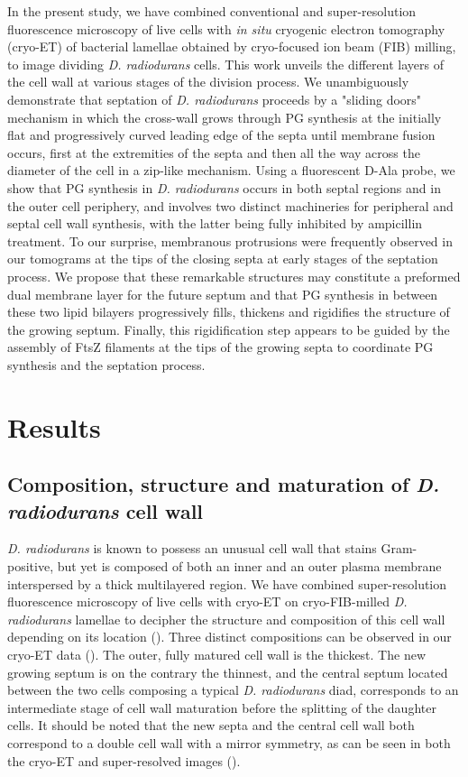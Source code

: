 In the present study, we have combined conventional and super-resolution fluorescence microscopy of live cells with \textit{in situ} cryogenic electron tomography (cryo-ET) of bacterial lamellae obtained by cryo-focused ion beam (FIB) milling, to image dividing \textit{D. radiodurans} cells.
This work unveils the different layers of the cell wall at various stages of the division process.
We unambiguously demonstrate that septation of \textit{D. radiodurans} proceeds by a "sliding doors" mechanism in which the cross-wall grows through PG synthesis at the initially flat and progressively curved leading edge of the septa until membrane fusion occurs, first at the extremities of the septa and then all the way across the diameter of the cell in a zip-like mechanism.
Using a fluorescent D-Ala probe, we show that PG synthesis in \textit{D. radiodurans} occurs in both septal regions and in the outer cell periphery, and involves two distinct machineries for peripheral and septal cell wall synthesis, with the latter being fully inhibited by ampicillin treatment.
To our surprise, membranous protrusions were frequently observed in our tomograms at the tips of the closing septa at early stages of the septation process.
We propose that these remarkable structures may constitute a preformed dual membrane layer for the future septum and that PG synthesis in between these two lipid bilayers progressively fills, thickens and rigidifies the structure of the growing septum.
Finally, this rigidification step appears to be guided by the assembly of FtsZ filaments at the tips of the growing septa to coordinate PG synthesis and the septation process.

\section{Results}

\subsection{Composition, structure and maturation of \textit{D. radiodurans} cell wall}

\textit{D. radiodurans} is known to possess an unusual cell wall that stains Gram-positive, but yet is composed of both an inner and an outer plasma membrane interspersed by a thick multilayered region.
We have combined super-resolution fluorescence microscopy of live cells with cryo-ET on cryo-FIB-milled \textit{D. radiodurans} lamellae to decipher the structure and composition of this cell wall depending on its location ().
Three distinct compositions can be observed in our cryo-ET data ().
The outer, fully matured cell wall is the thickest.
The new growing septum is on the contrary the thinnest, and the central septum located between the two cells composing a typical \textit{D. radiodurans} diad, corresponds to an intermediate stage of cell wall maturation before the splitting of the daughter cells.
It should be noted that the new septa and the central cell wall both correspond to a double cell wall with a mirror symmetry, as can be seen in both the cryo-ET and super-resolved images ().

